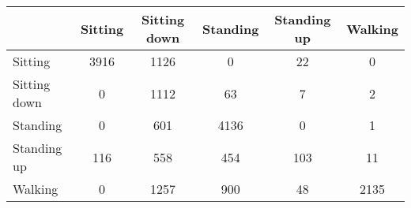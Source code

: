 \documentclass[a4paper, 11pt]{article}
\begin{document}
\begin{table}[!h]
  \renewcommand{\arraystretch}{1.5}
  \begin{tabular}[<+position+>]{l|c|c|c|c|c}
    & Sitting & Sitting down & Standing & Standing up & Walking \\ \hline
    Sitting & 3916 & 1126 & 0 & 22 & 0 \\
    Sitting down & 0 & 1112 & 63 & 7 & 2 \\
    Standing & 0 & 601 & 4136 & 0 & 1 \\
    Standing up & 116 & 558 & 454 & 103 & 11 \\
    Walking & 0 & 1257 & 900 & 48 & 2135
  \end{tabular}
\end{table}



\end{document}
